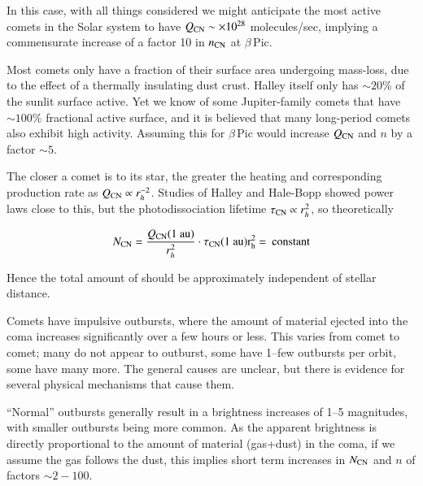 \documentclass{aa}
\newcommand{\bp}{$\beta$\,Pic}
\begin{document}
In this case, with all things considered we might anticipate the most active comets in the Solar system to have $Q_{\ce{CN}}\sim \times10^{28}$ molecules/sec, implying a commensurate increase of a factor 10 in $n_{\ce{CN}}$ at \bp{}.


Most comets only have a fraction of their surface area undergoing mass-loss, due to the effect of a thermally insulating dust crust.
%
Halley itself only has $\sim 20$\% of the sunlit surface active.
%
Yet we know of some Jupiter-family comets that have $\sim 100$\% fractional active surface, and it is believed that many long-period comets also exhibit high activity.
%
Assuming this for \bp{} would increase $Q_{\ce{CN}}$ and $n$ by a factor $\sim 5$.


The closer a comet is to its star, the greater the heating and corresponding production rate as $Q_{\ce{CN}}\propto r_h^{-2}$.
%
Studies of Halley and Hale-Bopp showed power laws close to this, but the photodissociation lifetime $\tau_{\ce{CN}}\propto r_h^{2}$, so theoretically

$$N_{\ce{CN}}=\frac{Q_{\ce{CN}}(1~\rm{au})}{r_h^2}\cdot  \tau_{\ce{CN}} (1~\rm{au}) r_h^2 =\:{\rm constant} $$

Hence the total amount of  should be approximately independent of stellar distance.

Comets have impulsive outbursts, where the amount of material ejected into the coma increases significantly over a few hours or less.
%
This varies from comet to comet; many do not appear to outburst, some have 1--few outbursts per orbit, some have many more.
%
The general causes are unclear, but there is evidence for several physical mechanisms that cause them. 

``Normal'' outbursts generally result in a brightness increases of 1--5 magnitudes, with smaller outbursts being more common.
%
As the apparent brightness is directly proportional to the amount of material (gas+dust) in the coma, if we assume the gas follows the dust, this implies short term increases in $N_{\ce{CN}}$ and $n$ of factors $\sim 2-100$.
\end{document}
